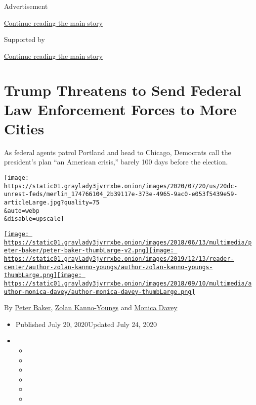 Advertisement

\protect\hyperlink{after-top}{Continue reading the main story}

Supported by

\protect\hyperlink{after-sponsor}{Continue reading the main story}

\hypertarget{trump-threatens-to-send-federal-law-enforcement-forces-to-more-cities}{%
\section{Trump Threatens to Send Federal Law Enforcement Forces to More
Cities}\label{trump-threatens-to-send-federal-law-enforcement-forces-to-more-cities}}

As federal agents patrol Portland and head to Chicago, Democrats call
the president's plan ``an American crisis,'' barely 100 days before the
election.

\texttt{[image: https://static01.graylady3jvrrxbe.onion/images/2020/07/20/us/20dc-unrest-feds/merlin\_174766104\_2b39117e-373e-4965-9ac0-e053f5439e59-articleLarge.jpg?quality=75\\\&auto=webp\\\&disable=upscale]}

\href{https://www.nytimes3xbfgragh.onion/by/peter-baker}{\texttt{[image: https://static01.graylady3jvrrxbe.onion/images/2018/06/13/multimedia/peter-baker/peter-baker-thumbLarge-v2.png]}}\href{https://www.nytimes3xbfgragh.onion/by/zolan-kanno-youngs}{\texttt{[image: https://static01.graylady3jvrrxbe.onion/images/2019/12/13/reader-center/author-zolan-kanno-youngs/author-zolan-kanno-youngs-thumbLarge.png]}}\href{https://www.nytimes3xbfgragh.onion/by/monica-davey}{\texttt{[image: https://static01.graylady3jvrrxbe.onion/images/2018/09/10/multimedia/author-monica-davey/author-monica-davey-thumbLarge.png]}}

By \href{https://www.nytimes3xbfgragh.onion/by/peter-baker}{Peter
Baker},
\href{https://www.nytimes3xbfgragh.onion/by/zolan-kanno-youngs}{Zolan
Kanno-Youngs} and
\href{https://www.nytimes3xbfgragh.onion/by/monica-davey}{Monica Davey}

\begin{itemize}
\item
  Published July 20, 2020Updated July 24, 2020
\item
  \begin{itemize}
  \item
  \item
  \item
  \item
  \item
  \item
  \end{itemize}
\end{itemize}

